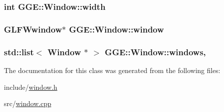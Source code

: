 \hypertarget{class_g_g_e_1_1_window_a5d878b7b885837f5062b516ecbdc22bf}{
\subsubsection[{width}]{\setlength{\rightskip}{0pt plus 5cm}int G\+G\+E\+::\+Window\+::width\hspace{0.3cm}{\ttfamily [private]}}}\label{class_g_g_e_1_1_window_a5d878b7b885837f5062b516ecbdc22bf}
\hypertarget{class_g_g_e_1_1_window_aefa5259b62d603d83ebf8963a019d73b}{
\subsubsection[{window}]{\setlength{\rightskip}{0pt plus 5cm}G\+L\+F\+Wwindow$\ast$ G\+G\+E\+::\+Window\+::window\hspace{0.3cm}{\ttfamily [private]}}}\label{class_g_g_e_1_1_window_aefa5259b62d603d83ebf8963a019d73b}
\hypertarget{class_g_g_e_1_1_window_a2ab7c16795aa37b881760cff6b487f06}{
\subsubsection[{windows}]{\setlength{\rightskip}{0pt plus 5cm}std\+::list$<$ {\bf Window} $\ast$ $>$ G\+G\+E\+::\+Window\+::windows\hspace{0.3cm}{\ttfamily [static]}, {\ttfamily [private]}}}\label{class_g_g_e_1_1_window_a2ab7c16795aa37b881760cff6b487f06}


The documentation for this class was generated from the following files\+:\begin{DoxyCompactItemize}
\item 
include/\hyperlink{window_8h}{window.\+h}\item 
src/\hyperlink{window_8cpp}{window.\+cpp}\end{DoxyCompactItemize}
